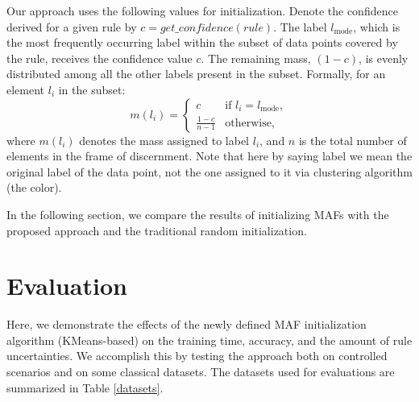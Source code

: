 \documentclass[10pt,a4paper,oneside]{article}
\begin{document}
Our approach uses the following values for initialization. Denote the confidence derived for a given rule by $c = get\_confidence(rule)$. The label $l_{\text{mode}}$, which is the most frequently occurring label within the subset of data points covered by the rule, receives the confidence value $c$. The remaining mass, $(1 - c)$, is evenly distributed among all the other labels present in the subset. Formally, for an element $l_i$ in the subset:
\[
m(l_i) = 
\begin{cases} 
c & \text{if } l_i = l_{\text{mode}}, \\
\frac{1-c}{n-1} & \text{otherwise},
\end{cases}
\]
where $m(l_i)$ denotes the mass assigned to label $l_i$, and $n$ is the total number of elements in the frame of discernment. Note that here by saying label we mean the original label of the data point, not the one assigned to it via clustering algorithm (the color). 

{\color{black}In the following section, we compare the results of initializing MAFs with the proposed approach and the traditional random initialization.}

\section{Evaluation}\label{3}
Here{\color{black},} we demonstrate the effects of the newly defined MAF initialization algorithm (KMeans-based) on the training time, accuracy, and the amount of rule uncertainties. We accomplish this by testing the approach both on controlled scenarios and on some classical datasets. The datasets used for evaluations are summarized in Table \ref{datasets}. 
\\
\renewcommand{\arraystretch}{1.15}   %
\end{document}
